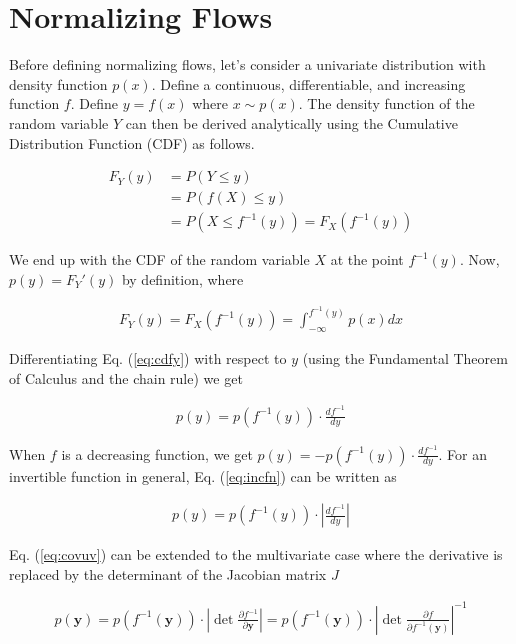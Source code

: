 \documentclass[runningheads]{llncs}
\begin{document}
\section{Normalizing Flows}

Before defining normalizing flows, let's consider a univariate distribution with density function $p(x)$. Define a continuous, differentiable, and increasing function $f$. Define $y = f(x)$ where $x \sim p(x)$. The density function of the random variable $Y$ can then be derived analytically using the Cumulative Distribution Function (CDF) as follows.

\begin{align}
F_{Y}(y) &= P(Y \leq y)\\
&= P(f(X) \leq y)\\
&= P(X \leq f^{-1}(y)) = F_{X}( f^{-1}(y))
\end{align}

We end up with the CDF of the random variable $X$ at the point $f^{-1}(y)$. Now, $p(y) = F_{Y}'(y)$ by definition, where

\begin{align}
F_{Y}(y) = F_{X}( f^{-1}(y)) = \int_{-\infty}^{ f^{-1}(y)}p(x) dx
\label{eq:cdfy}
\end{align}

Differentiating Eq. (\ref{eq:cdfy}) with respect to $y$ (using the Fundamental Theorem of Calculus and the chain rule) we get

\begin{align}
p(y) = p(f^{-1}(y))\cdot \frac{df^{-1}}{dy}
\label{eq:incfn}
\end{align}

When $f$ is a decreasing function, we get $p(y) = -p(f^{-1}(y))\cdot \frac{df^{-1}}{dy}$.  For an invertible function in general, Eq. (\ref{eq:incfn}) can be written as 

\begin{align}
p(y) = p(f^{-1}(y))\cdot \left|\frac{df^{-1}}{dy}\right|
\label{eq:covuv}
\end{align}

Eq. (\ref{eq:covuv}) can be extended to the multivariate case where the derivative is replaced by the determinant of the Jacobian matrix $J$

\begin{align}
p(\mathbf{y}) = p(f^{-1}(\mathbf{y}))\cdot \left|\det\frac{\partial f^{-1}}{\partial\mathbf{y}}\right| = p(f^{-1}(\mathbf{y}))\cdot \left|\det\frac{\partial f}{\partial f^{-1}(\mathbf{y})}\right|^{-1}
\label{eq:covmv}
\end{align}
\end{document}
